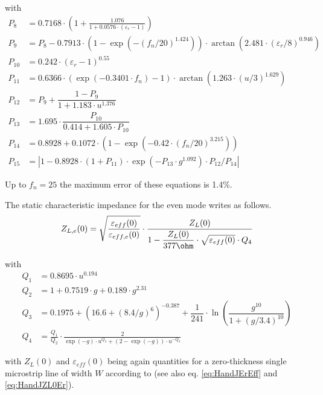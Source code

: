 with
\begin{align}
P_8 &= 0.7168\cdot \left(1 + \frac{1.076}{1+0.0576\cdot \left(\varepsilon_r-1\right)} \right)\\
P_9 &= P_8 - 0.7913\cdot\left( 1-\exp\left( -\left( f_n/20\right) ^{1.424} \right) \right)
     \cdot\arctan\left( 2.481\cdot\left( \varepsilon_r/8\right) ^{0.946} \right)\\
P_{10} &= 0.242\cdot \left(\varepsilon_r-1\right)^{0.55}\\
P_{11} &= 0.6366\cdot \left(\exp\left(-0.3401\cdot f_n\right)-1\right) \cdot
      \arctan\left(1.263\cdot\left( u/3 \right) ^{1.629} \right)\\
P_{12} &= P_9 + \dfrac{1-P_9}{1+1.183\cdot u^{1.376}}\\
P_{13} &= 1.695\cdot \dfrac{P_{10}}{0.414+1.605\cdot P_{10}}\\
P_{14} &= 0.8928 + 0.1072\cdot \left( 1-\exp\left(-0.42\cdot\left(
        f_n/20 \right) ^{3.215} \right)\right)\\
P_{15} &= \left| 1 - 0.8928\cdot \left(1+P_{11}\right) \cdot \exp\left(-P_{13}\cdot g^{1.092}\right)\cdot
         P_{12}/P_{14} \right|
\end{align}

Up to $f_n=25$ the maximum error of these equations is 1.4\%.

\addvspace{12pt}

The static characteristic impedance for the even mode writes as follows.
\begin{equation}
Z_{L,e}(0) = \sqrt{\dfrac{\varepsilon_{eff}(0)}{\varepsilon_{eff,e}(0)}} \cdot
             \dfrac{Z_L(0)}{1 - \dfrac{Z_L(0)}{377\ohm} \cdot \sqrt{\varepsilon_{eff}(0)} \cdot Q_4}
\end{equation}

with
\begin{align}
Q_1 &= 0.8695\cdot u^{0.194}\\
Q_2 &= 1 + 0.7519\cdot g + 0.189\cdot g^{2.31}\\
Q_3 &= 0.1975 + \left( 16.6 + \left( 8.4/g \right) ^6 \right) ^{-0.387}
     + \dfrac{1}{241} \cdot \ln\left( \dfrac{g^{10}}{1+\left( g/3.4\right) ^{10}} \right)\\
Q_4 &= \frac{Q_1}{Q_2}\cdot \frac{2}{ \exp\left(-g\right)\cdot u^{Q_3} + (2-\exp\left(-g\right))\cdot u^{-Q_3} }
\end{align}

with $Z_L(0)$ and $\varepsilon_{eff}(0)$ being again quantities for a
zero-thickness single microstrip line of width $W$ according to
\cite{Hammerstad} (see also eq. \eqref{eq:HandJErEff} and
\eqref{eq:HandJZL0Er}).

